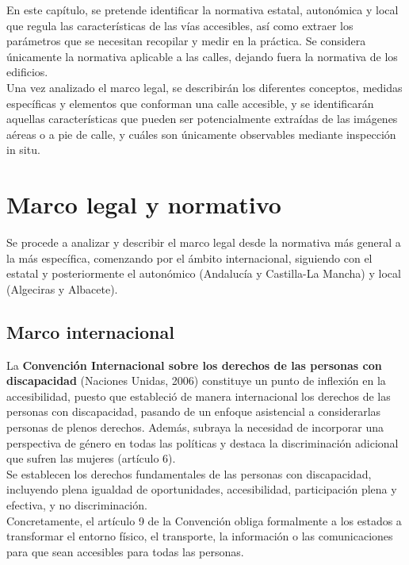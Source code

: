 \label{cap:normativa}

En este capítulo, se pretende identificar la normativa estatal, autonómica y local que regula las características de las vías accesibles, así como extraer los parámetros que se necesitan recopilar y medir en la práctica. Se considera únicamente la normativa aplicable a las calles, dejando fuera la normativa de los edificios.
\\

Una vez analizado el marco legal, se describirán los diferentes conceptos, medidas específicas y elementos que conforman una calle accesible, y se identificarán aquellas características que pueden ser potencialmente extraídas de las imágenes aéreas o a pie de calle, y cuáles son únicamente observables mediante inspección in situ.
\\

\section{Marco legal y normativo}

\label{sec:marco-legal}
Se procede a analizar y describir el marco legal desde la normativa más general a la más específica, comenzando por el ámbito internacional, siguiendo con el estatal y posteriormente el autonómico (Andalucía y Castilla-La Mancha) y local (Algeciras y Albacete).

\subsection{Marco internacional}
La \textbf{Convención Internacional sobre los derechos de las personas con discapacidad} (Naciones Unidas, 2006) constituye un punto de inflexión en la accesibilidad, puesto que estableció de manera internacional los derechos de las personas con discapacidad, pasando de un enfoque asistencial a considerarlas personas de plenos derechos. Además, subraya la necesidad de incorporar una perspectiva de género en todas las políticas y destaca la discriminación adicional que sufren las mujeres (artículo 6).
\\

Se establecen los derechos fundamentales de las personas con discapacidad, incluyendo plena igualdad de oportunidades, accesibilidad, participación plena y efectiva, y no discriminación.
\\

Concretamente, el artículo 9 de la Convención obliga formalmente a los estados a transformar el entorno físico, el transporte, la información o las comunicaciones para que sean accesibles para todas las personas.
\\

